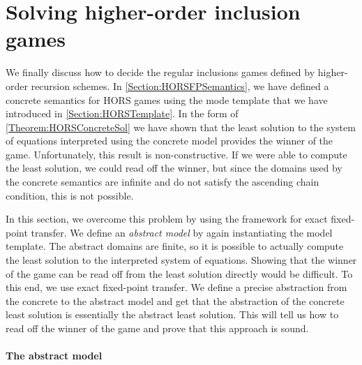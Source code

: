 \documentclass[../../diss.tex]{subfiles}
\begin{document}
\section{Solving higher-order inclusion games}%
\label{Section:HORSSolving}

We finally discuss how to decide the regular inclusions games defined by higher-order recursion schemes.
In \cref{Section:HORSFPSemantics}, we have defined a concrete semantics for HORS games using the mode template that we have introduced in \cref{Section:HORSTemplate}.
In the form of \cref{Theorem:HORSConcreteSol} we have shown that the least solution to the system of equations interpreted using the concrete model provides the winner of the game.
Unfortunately, this result is non-constructive.
If we were able to compute the least solution, we could read off the winner, but since the domains used by the concrete semantics are infinite and do not satisfy the ascending chain condition, this is not possible.

In this section, we overcome this problem by using the framework for exact fixed-point transfer.
We define an \emph{abstract model} by again instantiating the model template.
The abstract domains are finite, so it is possible to actually compute the least solution to the interpreted system of equations.
Showing that the winner of the game can be read off from the least solution directly would be difficult.
To this end, we use exact fixed-point transfer.
We define a precise abstraction from the concrete to the abstract model and get that the abstraction of the concrete least solution is essentially the abstract least solution.
This will tell us how to read off the winner of the game and prove that this approach is sound.

\paragraph{The abstract model}
\end{document}
